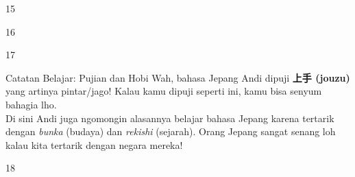 \begin{convobox}{15}
    \noindent
      
     

    \vspace{1.5em}
\end{convobox}

\begin{convobox}{16}
    \noindent
       
      
      

    \vspace{1.5em}
\end{convobox}

\begin{convobox}{17}
    \noindent
      
      
      
        

    \vspace{1.5em}
\end{convobox}

\begin{lessonbox}{Catatan Belajar: Pujian dan Hobi}
    Wah, bahasa Jepang Andi dipuji \textbf{上手 (jouzu)} yang artinya pintar/jago! Kalau kamu dipuji seperti ini, kamu bisa senyum bahagia lho. \\
    
    Di sini Andi juga ngomongin alasannya belajar bahasa Jepang karena tertarik dengan \textit{bunka} (budaya) dan \textit{rekishi} (sejarah). Orang Jepang sangat senang loh kalau kita tertarik dengan negara mereka!
\end{lessonbox}

\begin{convobox}{18}
    \noindent
      
      
     

    \vspace{1.5em}
\end{convobox}

